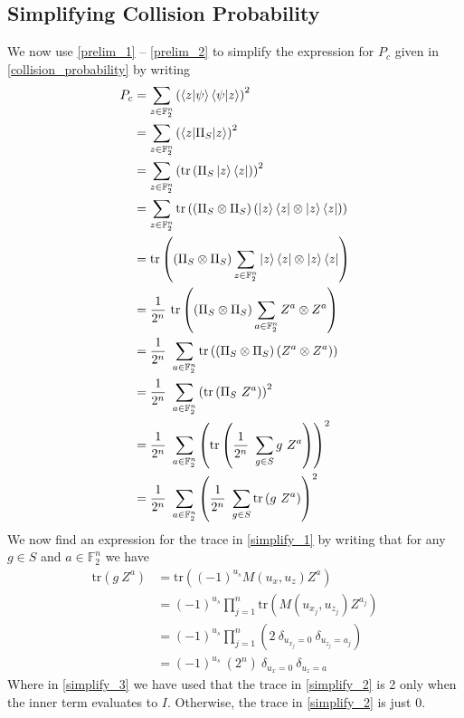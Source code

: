 \message{ !name(report_1.tex)}\documentclass[11pt]{article}
\theoremstyle{definition}
\theoremstyle{plain}
\begin{document}
\subsection{Simplifying Collision Probability}\label{simplifying_cp}
We now use {\ref{prelim_1}} {--} {\ref{prelim_2}} to simplify the expression for $P_c$ given in {\ref{collision_probability}} by writing
\begin{align}
  P_c &= \sum\limits_{z \in \mathbb{F}_2^n}
        {\left( \braket{z | \psi} \braket{\psi | z} \right)}^2 \\
      &= \sum\limits_{z \in \mathbb{F}_2^n}
        {\left( \braket{z | \Pi_S | z} \right)}^2 \\ 
      &= \sum\limits_{z \in \mathbb{F}_2^n}
        {\left( \text{tr}\left(\Pi_S \ket{z} \bra{z}\right) \right)}^2 \\
      &= \sum\limits_{z \in \mathbb{F}_2^n}
        \text{tr}\left( \left(\Pi_S \otimes \Pi_S \right)
        \left(\ket{z} \bra{z} \otimes \ket{z} \bra{z} \right) \right)  \\
      &= \text{tr}\left( \left(\Pi_S \otimes \Pi_S \right)
        \sum\limits_{z \in \mathbb{F}_2^n}
        \ket{z} \bra{z} \otimes \ket{z} \bra{z} \right)  \\
      &= \frac{1}{2^n} \ \text{tr}\left( \left(\Pi_S \otimes \Pi_S \right)
        \sum\limits_{a \in \mathbb{F}_2^n}
        Z^a \otimes Z^a \right)  \\
      &= \frac{1}{2^n} \  \sum\limits_{a \in \mathbb{F}_2^n}
        \text{tr}\left( \left(\Pi_S \otimes \Pi_S \right)
        \left(Z^a \otimes Z^a \right) \right) \\
      &= \frac{1}{2^n} \  \sum\limits_{a \in \mathbb{F}_2^n}
        {\left( \text{tr} \left(\Pi_S \ Z^a \right) \right)}^2 \\
      &= \frac{1}{2^n} \  \sum\limits_{a \in \mathbb{F}_2^n}
        {\left( \text{tr} \left(\frac{1}{2^n} \
        \sum\limits_{g \in S} g \ Z^a \right) \right)}^2 \\
      &= \frac{1}{2^{n}} \  \sum\limits_{a \in \mathbb{F}_2^n}
        {\left( \frac{1}{2^n} \ \sum\limits_{g \in S}
        \text{tr} \left(  g \ Z^a \right) \right)}^2 \label{simplify_1}
\end{align}
We now find an expression for the trace in {\ref{simplify_1}} by writing that for any $g \in S$ and $a \in \mathbb{F}_2^n$ we have
\begin{align}
  \text{tr} \left( g \ Z^a \right)
  &= \text{tr} \left({(-1)}^{u_s} M(u_x, u_z) Z^a \right) \\ 
  &= {(-1)}^{u_s} \prod\limits_{j=1}^n
    \text{tr} \left(M(u_{x_j}, u_{z_j}) Z^{a_j} \right) \label{simplify_2}\\
  &= {(-1)}^{u_s} \prod\limits_{j=1}^n
    ( 2 \ \delta_{u_{x_j}= 0} \ \delta_{u_{z_j}=a_j} ) \label{simplify_3}\\
  &= {(-1)}^{u_s} \ (2^n) \ \delta_{u_x = 0} \ \delta_{u_z = a} \label{simplify_4}
\end{align} 
Where in {\ref{simplify_3}} we have used that the trace in {\ref{simplify_2}} is 2 only when the inner term evaluates to $I$. Otherwise, the trace in {\ref{simplify_2}} is just 0.
\end{document}
